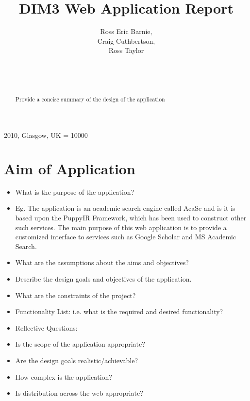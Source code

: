 \documentclass{sig-alt-release2}
\begin{document}
\newcommand{\todo}[1]{\textcolor{red}{#1}}
\def\newblock{\hskip .11em plus .33em minus .07em}

 {2010, Glasgow, UK} 
\widowpenalty = 10000

\title{DIM3 Web Application Report}

\author{
\alignauthor
Ross Eric Barnie, \\
Craig Cuthbertson, \\
Ross Taylor \\
\\
\\
\\
}
\maketitle

\begin{abstract}
Provide a concise summary of the design of the application

\end{abstract}

\section{Aim of Application}
\begin{itemize}
\item	What is the purpose of the application?
\item	Eg. The application is an academic search engine called AcaSe and is it is based upon the PuppyIR Framework\cite{glassey2011framework}, which has been used to construct other such services\cite{glassey2010fifi,elliot2010fifi}. The main purpose of this web application is to provide a customized interface to services such as Google Scholar and MS Academic Search. 
\item	What are the assumptions about the aims and objectives?
\item	Describe the design goals and objectives of the application.
\item	What are the constraints of the project?
\item	Functionality List: i.e. what is the required and desired functionality?
\item	Reflective Questions: 
\item	Is the scope of the application appropriate? 
\item	Are the design goals realistic/achievable? 
\item	How complex is the application? 
\item	Is distribution across the web appropriate? 
\end{itemize}
\end{document}
